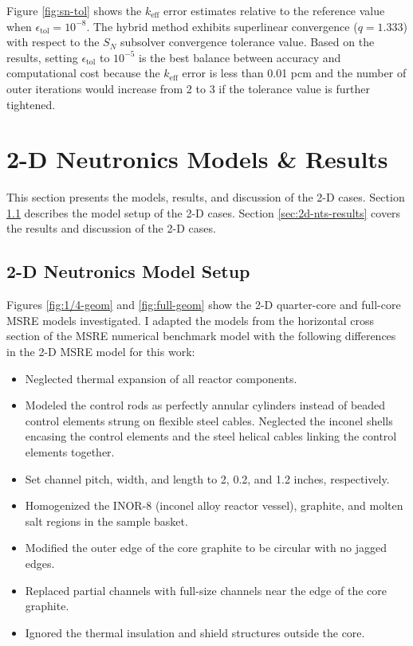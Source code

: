Figure \ref{fig:sn-tol} shows the $k_\text{eff}$ error estimates relative to the reference value
when $\epsilon_\text{tol}=10^{-8}$. The hybrid method exhibits superlinear convergence ($q=1.333$)
with respect to the $S_N$ subsolver convergence tolerance value. Based on the results, setting
$\epsilon_\text{tol}$ to $10^{-5}$ is the best balance between accuracy and computational
cost because the $k_\text{eff}$ error is less than 0.01 pcm and the number of outer iterations
would increase from 2 to 3 if the tolerance value is further tightened.

\FloatBarrier

\section{2-D Neutronics Models \& Results} \label{sec:2d-results}

This section presents the models, results, and discussion of the 2-D cases. Section
\ref{sec:2d-model-setup} describes the model setup of the 2-D cases. Section
\ref{sec:2d-nts-results} covers the results and discussion of the 2-D cases.

\subsection{2-D Neutronics Model Setup} \label{sec:2d-model-setup}

Figures \ref{fig:1/4-geom} and \ref{fig:full-geom} show the 2-D quarter-core and full-core
\gls{MSRE} models investigated. I adapted the models from the horizontal cross section of the
\gls{MSRE} numerical benchmark model \cite{fratoni_molten_2020} with the
following differences in the 2-D \gls{MSRE} model for this work:

\begin{itemize}
  \item Neglected thermal expansion of all reactor components.
  \item Modeled the control rods as perfectly annular cylinders instead of beaded control elements
    strung on flexible steel cables. Neglected the inconel shells encasing the control elements and
    the steel helical cables linking the control elements together.
  \item Set channel pitch, width, and length to 2, 0.2, and 1.2 inches, respectively.
  \item Homogenized the INOR-8 (inconel alloy reactor vessel), graphite, and molten salt regions in the sample basket.
  \item Modified the outer edge of the core graphite to be circular with no jagged edges.
  \item Replaced partial channels with full-size channels near the edge of the core graphite.
  \item Ignored the thermal insulation and shield structures outside the core.
\end{itemize}

